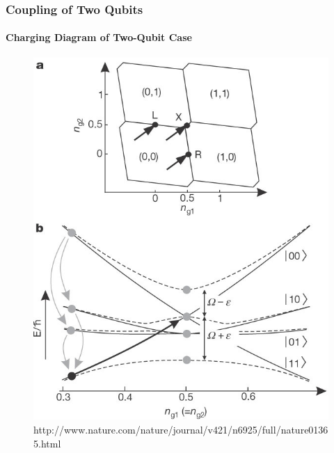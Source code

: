 \documentclass{beamer}
\begin{document}
\begin{frame}
    \frametitle{Coupling of Two Qubits}
    \framesubtitle{Charging Diagram of Two-Qubit Case}
    \begin{figure}[ht!]
        \centering
        \includegraphics[height=0.6\textheight]{img/charging-diagram.jpg}
        \caption{http://www.nature.com/nature/journal/v421/n6925/full/nature01365.html}
    \end{figure}
\end{frame}

\end{document}
